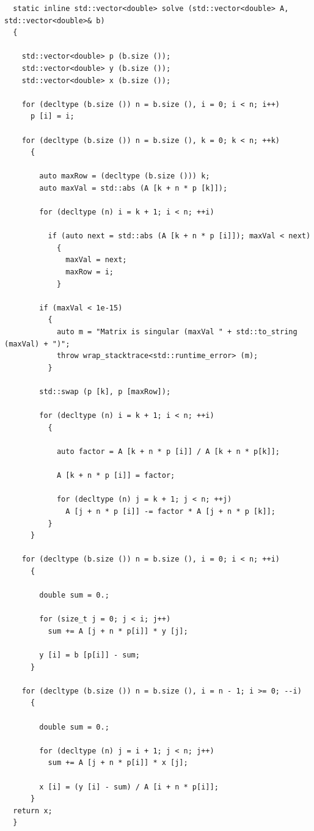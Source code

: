 \documentclass{article}[12pt,a4paper]
\begin{document}
\begin{verbatim}
  static inline std::vector<double> solve (std::vector<double> A, std::vector<double>& b)
  {

    std::vector<double> p (b.size ());
    std::vector<double> y (b.size ());
    std::vector<double> x (b.size ());

    for (decltype (b.size ()) n = b.size (), i = 0; i < n; i++)
      p [i] = i;

    for (decltype (b.size ()) n = b.size (), k = 0; k < n; ++k)
      {

        auto maxRow = (decltype (b.size ())) k;
        auto maxVal = std::abs (A [k + n * p [k]]);

        for (decltype (n) i = k + 1; i < n; ++i)

          if (auto next = std::abs (A [k + n * p [i]]); maxVal < next)
            {
              maxVal = next;
              maxRow = i;
            }

        if (maxVal < 1e-15)
          {
            auto m = "Matrix is singular (maxVal " + std::to_string (maxVal) + ")";
            throw wrap_stacktrace<std::runtime_error> (m);
          }

        std::swap (p [k], p [maxRow]);

        for (decltype (n) i = k + 1; i < n; ++i)
          {

            auto factor = A [k + n * p [i]] / A [k + n * p[k]];

            A [k + n * p [i]] = factor;
            
            for (decltype (n) j = k + 1; j < n; ++j)
              A [j + n * p [i]] -= factor * A [j + n * p [k]];
          }
      }

    for (decltype (b.size ()) n = b.size (), i = 0; i < n; ++i)
      {

        double sum = 0.;

        for (size_t j = 0; j < i; j++)
          sum += A [j + n * p[i]] * y [j];

        y [i] = b [p[i]] - sum;
      }

    for (decltype (b.size ()) n = b.size (), i = n - 1; i >= 0; --i)
      {

        double sum = 0.;

        for (decltype (n) j = i + 1; j < n; j++)
          sum += A [j + n * p[i]] * x [j];

        x [i] = (y [i] - sum) / A [i + n * p[i]];
      }
  return x;
  }
\end{verbatim}
\end{document}

